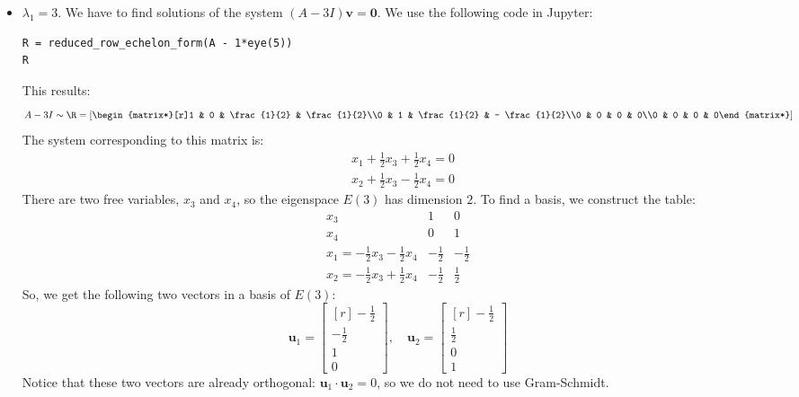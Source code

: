\documentclass[12pt]{article}
\begin{document}
\begin{itemize}

\item $\lambda_1=3$. We have to find solutions of the system $(A-3I)\mathbf{v}=\mathbf{0}$. 
We use the following code in Jupyter:
\begin{lstlisting}
R = reduced_row_echelon_form(A - 1*eye(5))
R
\end{lstlisting}
This results:
\[
A-3I\sim\R = \left[\begin{matrix*}[r]1 & 0 & \frac{1}{2} & \frac{1}{2}\\0 & 1 & \frac{1}{2} & - \frac{1}{2}\\0 & 0 & 0 & 0\\0 & 0 & 0 & 0\end{matrix*}\right]
\]
The system corresponding to this matrix is:
\begin{align*}
&x_1+\frac{1}{2}x_3+\frac{1}{2}x_4=0\\
&x_2+\frac{1}{2}x_3-\frac{1}{2}x_4=0
\end{align*}
There are two free variables, $x_3$ and $x_4$, so the eigenspace $E(3)$ has dimension $2$. To find a basis, we construct the table:
\[
\begin{array}{c|rr}
x_3 & 1 & 0 \\
x_4 & 0 & 1 \\
x_1=-\frac{1}{2}x_3-\frac{1}{2}x_4 & -\frac{1}{2} & -\frac{1}{2} \\
x_2=-\frac{1}{2}x_3+\frac{1}{2}x_4 & -\frac{1}{2} & \frac{1}{2} 
\end{array}
\]
So, we get the following two vectors in a basis of $E(3)$:
\[
\mathbf{u}_1=\left[\begin{matrix*}[r]- \frac{1}{2}\\-\frac{1}{2}\\1\\0\end{matrix*}\right],\quad
\mathbf{u}_2=\left[\begin{matrix*}[r]- \frac{1}{2}\\\frac{1}{2}\\0\\1\end{matrix*}\right]
\]
Notice that these two vectors are already orthogonal: $\mathbf{u}_1\cdot\mathbf{u}_2=0$, so we do not need to use Gram-Schmidt.



\end{itemize}
\end{document}
